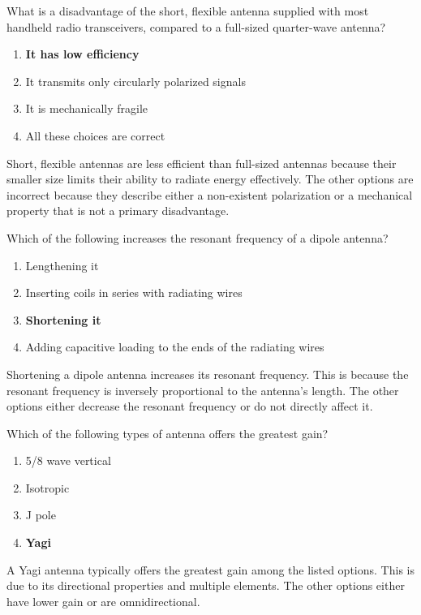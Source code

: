 \begin{tcolorbox}[colback=gray!10!white,colframe=black!75!black,title={T9A04}]
    What is a disadvantage of the short, flexible antenna supplied with most handheld radio transceivers, compared to a full-sized quarter-wave antenna?
    \begin{enumerate}[label=\Alph*),noitemsep]
        \item \textbf{It has low efficiency}
        \item It transmits only circularly polarized signals
        \item It is mechanically fragile
        \item All these choices are correct
    \end{enumerate}
\end{tcolorbox}
Short, flexible antennas are less efficient than full-sized antennas because their smaller size limits their ability to radiate energy effectively. The other options are incorrect because they describe either a non-existent polarization or a mechanical property that is not a primary disadvantage.


\begin{tcolorbox}[colback=gray!10!white,colframe=black!75!black,title={T9A05}]
    Which of the following increases the resonant frequency of a dipole antenna?
    \begin{enumerate}[label=\Alph*),noitemsep]
        \item Lengthening it
        \item Inserting coils in series with radiating wires
        \item \textbf{Shortening it}
        \item Adding capacitive loading to the ends of the radiating wires
    \end{enumerate}
\end{tcolorbox}
Shortening a dipole antenna increases its resonant frequency. This is because the resonant frequency is inversely proportional to the antenna's length. The other options either decrease the resonant frequency or do not directly affect it.


\begin{tcolorbox}[colback=gray!10!white,colframe=black!75!black,title={T9A06}]
    Which of the following types of antenna offers the greatest gain?
    \begin{enumerate}[label=\Alph*),noitemsep]
        \item 5/8 wave vertical
        \item Isotropic
        \item J pole
        \item \textbf{Yagi}
    \end{enumerate}
\end{tcolorbox}
A Yagi antenna typically offers the greatest gain among the listed options. This is due to its directional properties and multiple elements. The other options either have lower gain or are omnidirectional.

